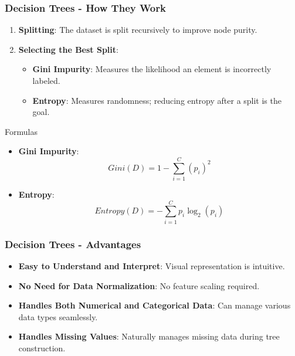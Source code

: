 \documentclass[aspectratio=169]{beamer}
\begin{document}
\begin{frame}[fragile]
    \frametitle{Decision Trees - How They Work}
    \begin{enumerate}
        \item \textbf{Splitting}: The dataset is split recursively to improve node purity.
        \item \textbf{Selecting the Best Split}:
            \begin{itemize}
                \item \textbf{Gini Impurity}: Measures the likelihood an element is incorrectly labeled.
                \item \textbf{Entropy}: Measures randomness; reducing entropy after a split is the goal.
            \end{itemize}
    \end{enumerate}

    \begin{block}{Formulas}
        \begin{itemize}
            \item \textbf{Gini Impurity}: 
            \begin{equation}
                Gini(D) = 1 - \sum_{i=1}^{C} (p_i)^2 
            \end{equation}
            \item \textbf{Entropy}: 
            \begin{equation}
                Entropy(D) = -\sum_{i=1}^{C} p_i \log_2(p_i) 
            \end{equation}
        \end{itemize}
    \end{block}
\end{frame}

\begin{frame}[fragile]
    \frametitle{Decision Trees - Advantages}
    \begin{itemize}
        \item \textbf{Easy to Understand and Interpret}: Visual representation is intuitive.
        \item \textbf{No Need for Data Normalization}: No feature scaling required.
        \item \textbf{Handles Both Numerical and Categorical Data}: Can manage various data types seamlessly.
        \item \textbf{Handles Missing Values}: Naturally manages missing data during tree construction.
    \end{itemize}
\end{frame}
\end{document}
